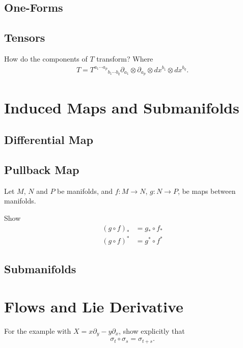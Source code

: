 \subsection{One-Forms}

\subsection{Tensors}

\begin{Ebox}
  How do the components of $T$ transform? Where 
  \begin{align}
    T= T^{a_1\cdots a_p}{}_{b_1\cdots b_q} \partial_{a_1}\otimes\partial_{a_p}\otimes dx^{b_1}\otimes dx^{b_q}.
  \end{align}
\end{Ebox}

\section{Induced Maps and Submanifolds}

\subsection{Differential Map}

\subsection{Pullback Map}

\begin{Ebox}
  Let $M$, $N$ and $P$ be manifolds, and $ f:M\to N$, $g:N\to P$,  be maps between manifolds. 

  Show
  \begin{align*}
    (g\circ f)_* &= g_*\circ f_*\\
    (g\circ f)^* &= g^*\circ f^*
  \end{align*}
\end{Ebox}

\subsection{Submanifolds}

\section{Flows and Lie Derivative}

\begin{Ebox}
  For the example with $X=x\partial_y -y\partial_x$, show explicitly that 
  \begin{align}
    \sigma_t\circ \sigma_s = \sigma_{t+s}.
  \end{align}
\end{Ebox}


